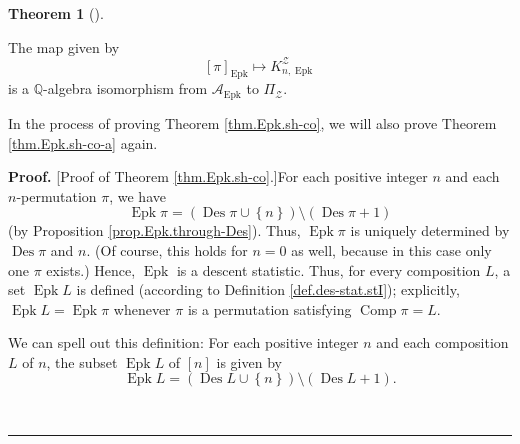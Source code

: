 \documentclass[numbers=enddot,12pt,final,onecolumn,notitlepage]{scrartcl}%
\theoremstyle{definition}
\newtheorem{theo}{Theorem}[section]
\newenvironment{theorem}[1][]
{\begin{theo}[#1]\begin{leftbar}}
{\end{leftbar}\end{theo}}
\newenvironment{proof}[1][Proof]{\noindent\textbf{#1.} }{\ \rule{0.5em}{0.5em}}
\newenvironment{verlong}{}{}
\begin{document}
\begin{theorem}
\label{thm.Epk.sh-co}The map given by%
\[
\left[  \pi\right]  _{\operatorname*{Epk}}\mapsto K_{n,\operatorname*{Epk}%
}^{\mathcal{Z}}%
\]
is a $\mathbb{Q}$-algebra isomorphism from $\mathcal{A}_{\operatorname*{Epk}}$
to $\Pi_{\mathcal{Z}}$.
\end{theorem}

In the process of proving Theorem \ref{thm.Epk.sh-co}, we will also prove
Theorem \ref{thm.Epk.sh-co-a} again.

\begin{proof}
[Proof of Theorem \ref{thm.Epk.sh-co}.]For each positive integer $n$ and each
$n$-permutation $\pi$, we have%
\[
\operatorname*{Epk}\pi=\left(  \operatorname*{Des}\pi\cup\left\{  n\right\}
\right)  \setminus\left(  \operatorname*{Des}\pi+1\right)
\]
(by Proposition \ref{prop.Epk.through-Des}). Thus, $\operatorname*{Epk}\pi$ is
uniquely determined by $\operatorname*{Des}\pi$ and $n$. (Of course, this
holds for $n=0$ as well, because in this case only one $\pi$ exists.) Hence,
$\operatorname*{Epk}$ is a descent statistic. Thus, for every composition $L$,
a set $\operatorname*{Epk}L$ is defined (according to Definition
\ref{def.des-stat.stI}); explicitly, $\operatorname*{Epk}L=\operatorname*{Epk}%
\pi$ whenever $\pi$ is a permutation satisfying $\operatorname*{Comp}\pi=L$.

\begin{verlong}
We can spell out this definition: For each positive integer $n$ and each
composition $L$ of $n$, the subset $\operatorname*{Epk}L$ of $\left[
n\right]  $ is given by%
\[
\operatorname*{Epk}L=\left(  \operatorname*{Des}L\cup\left\{  n\right\}
\right)  \setminus\left(  \operatorname*{Des}L+1\right)  .
\]

\end{verlong}


\end{proof}
\end{document}
